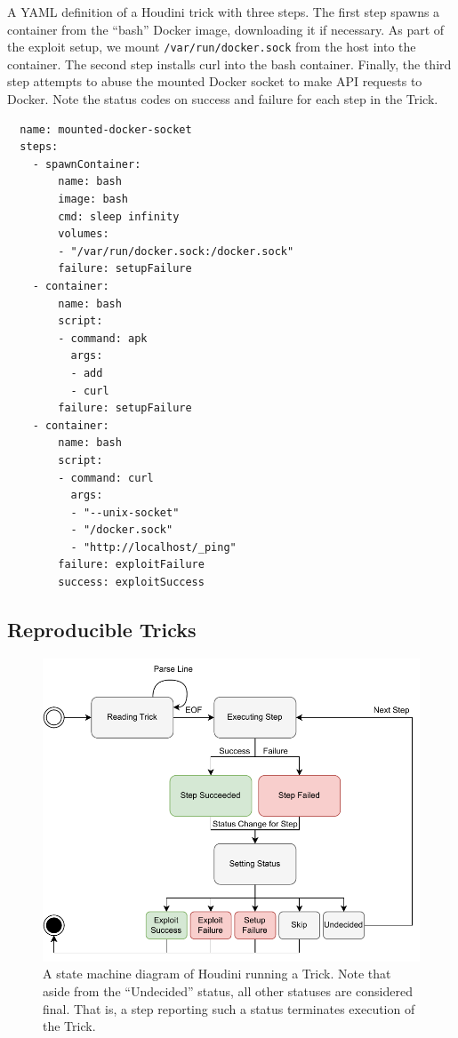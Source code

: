 \begin{listing}
  \caption{A YAML definition of a Houdini trick with three steps. The first step spawns
  a container from the \enquote{bash} Docker image, downloading it if necessary. As part
  of the exploit setup, we mount \texttt{/var/run/docker.sock} from the host into the
  container. The second step installs curl into the bash container. Finally, the third
  step attempts to abuse the mounted Docker socket to make API requests to Docker. Note the
  status codes on success and failure for each step in the Trick.}
  \label{lst:mounted-docker-socket}
  \begin{verbatim}
  name: mounted-docker-socket
  steps:
    - spawnContainer:
        name: bash
        image: bash
        cmd: sleep infinity
        volumes:
        - "/var/run/docker.sock:/docker.sock"
        failure: setupFailure
    - container:
        name: bash
        script:
        - command: apk
          args:
          - add
          - curl
        failure: setupFailure
    - container:
        name: bash
        script:
        - command: curl
          args:
          - "--unix-socket"
          - "/docker.sock"
          - "http://localhost/_ping"
        failure: exploitFailure
        success: exploitSuccess
  \end{verbatim}
\end{listing}

\subsection{Reproducible Tricks}



\begin{figure}
  \label{fig:state-machine}
  \includegraphics[width=1\linewidth]{figs/houdini-state-machine.pdf}
  \caption{A state machine diagram of Houdini running a Trick. Note that aside from the
  \enquote{Undecided} status, all other statuses are considered final. That is, a step
  reporting such a status terminates execution of the Trick.}
\end{figure}


